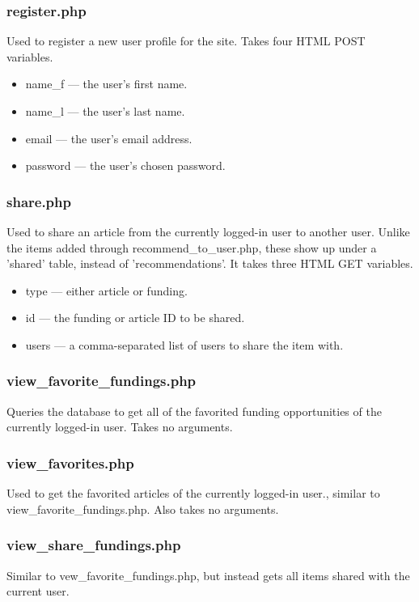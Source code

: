 \documentclass[onecolumn]{IEEEtran}
\begin{document}
\subsubsection{register.php}
Used to register a new user profile for the site. Takes four HTML POST variables. 
\begin{itemize}
    \item name\_f --- the user's first name. 
    \item name\_l --- the user's last name. 
    \item email --- the user's email address. 
    \item password --- the user's chosen password. 
\end{itemize}    

\subsubsection{share.php}
Used to share an article from the currently logged-in user to another user. Unlike the items added through recommend\_to\_user.php, these show up under a 'shared' table, instead of 'recommendations'. It takes three HTML GET variables.  
\begin{itemize}
    \item type --- either article or funding. 
    \item id --- the funding or article ID to be shared. 
    \item users --- a comma-separated list of users to share the item with. 
\end{itemize}    

\subsubsection{view\_favorite\_fundings.php}
Queries the database to get all of the favorited funding opportunities of the currently logged-in user. Takes no arguments. 

\subsubsection{view\_favorites.php}
Used to get the favorited articles of the currently logged-in user., similar to view\_favorite\_fundings.php. Also takes no arguments. 

\subsubsection{view\_share\_fundings.php}
Similar to vew\_favorite\_fundings.php, but instead gets all items shared with the current user. 
\end{document}
